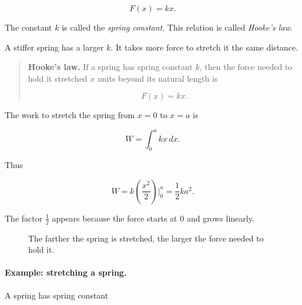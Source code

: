 \[
F(x)=kx.
\]

The constant \(k\) is called the \emph{spring constant}.  This relation is called
\emph{Hooke's law}.

A stiffer spring has a larger \(k\).  It takes more force to stretch it the same distance.

\begin{quote}
\textbf{Hooke's law.}
If a spring has spring constant \(k\), then the force needed to hold it stretched
\(x\) units beyond its natural length is

\[
\boxed{
F(x)=kx.
}
\]
\end{quote}

The work to stretch the spring from \(x=0\) to \(x=a\) is

\[
W=\int_0^a kx\,dx.
\]

Thus

\[
W
=
k\left(\frac{x^2}{2}\right)\Big|_0^a
=
\boxed{\frac12ka^2}.
\]

The factor \(\frac12\) appears because the force starts at \(0\) and grows linearly.

\begin{figure}[h]
\centering
{}
\caption{The farther the spring is stretched, the larger the force needed to hold it.}
\label{fig:spring-hookes-law}
\end{figure}

\paragraph{Example: stretching a spring.}
A spring has spring constant

